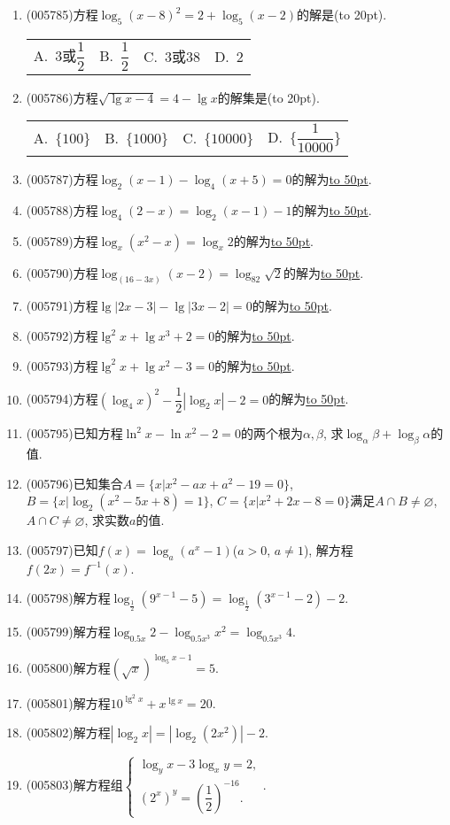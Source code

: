 \documentclass[10pt,a4paper]{article}
\newcommand{\blank}[1]{\underline{\hbox to #1pt{}}}
\newcommand{\bracket}[1]{(\hbox to #1pt{})}
\newcommand{\fourch}[4]{\par\begin{tabular}{p{.23\textwidth}p{.23\textwidth}p{.23\textwidth}p{.23\textwidth}}
A.~#1 &B.~#2& C.~#3& D.~#4
\end{tabular}}
\begin{document}
\begin{enumerate}[1.]
\fourch{$10^{1+\sqrt 2}$或$10^{1-\sqrt 2}$}{$1+\sqrt 2$或$1-\sqrt 2$}{$10^{1+\sqrt 3}$或$10^{1-\sqrt 3}$}{$1+\sqrt 3$或$1-\sqrt 3$}
\item {\tiny (005785)}方程$\log_5(x-8)^2=2+\log_5(x-2)$的解是\bracket{20}.
\fourch{3或$\dfrac 12$}{$\dfrac 12$}{$3$或$38$}{$2$}
\item {\tiny (005786)}方程$\sqrt {\lg x-4}=4-\lg x$的解集是\bracket{20}.
\fourch{$\{100\}$}{$\{1000\}$}{$\{10000\}$}{$\{\dfrac 1{10000}\}$}
\item {\tiny (005787)}方程$\log_2(x-1)-\log_4(x+5)=0$的解为\blank{50}.
\item {\tiny (005788)}方程$\log_4(2-x)=\log_2(x-1)-1$的解为\blank{50}.
\item {\tiny (005789)}方程$\log_x(x^2-x)=\log_x2$的解为\blank{50}.
\item {\tiny (005790)}方程$\log_{(16-3x)}(x-2)=\log_82\sqrt 2$的解为\blank{50}.
\item {\tiny (005791)}方程$\lg|2x-3|-\lg|3x-2|=0$的解为\blank{50}.
\item {\tiny (005792)}方程$\lg ^2x+\lg x^3+2=0$的解为\blank{50}.
\item {\tiny (005793)}方程$\lg ^2x+\lg x^2-3=0$的解为\blank{50}.
\item {\tiny (005794)}方程$(\log_4x)^2-\dfrac 12|\log_2x|-2=0$的解为\blank{50}.
\item {\tiny (005795)}已知方程$\ln ^2x-\ln x^2-2=0$的两个根为$\alpha ,\beta$, 求$\log_{\alpha }\beta +\log_{\beta }\alpha$的值.
\item {\tiny (005796)}已知集合$A=\{x|x^2-ax+a^2-19=0\}$, $B=\{x|\log_2(x^2-5x+8)=1\}$, $C=\{x|x^2+2x-8=0\}$满足$A\cap B\ne \varnothing$, $A\cap C\ne \varnothing$, 求实数$a$的值.
\item {\tiny (005797)}已知$f(x)=\log_a(a^x-1)$($a>0$, $a\ne 1$), 解方程$f(2x)=f^{-1}(x)$.
\item {\tiny (005798)}解方程$\log_{\frac 12}(9^{x-1}-5)=\log_{\frac 12}(3^{x-1}-2)-2$.
\item {\tiny (005799)}解方程$\log_{0.5x}2-\log_{0.5x^3}x^2=\log_{0.5x^3}4$.
\item {\tiny (005800)}解方程$(\sqrt x)^{\log_5x-1}=5$.
\item {\tiny (005801)}解方程$10^{\lg ^2x}+x^{\lg x}=20$.
\item {\tiny (005802)}解方程$|\log_2x|=|\log_2(2x^2)|-2$.
\item {\tiny (005803)}解方程组$\begin{cases} \log_yx-3\log_xy=2, \\ (2^x)^y=(\dfrac 12)^{-16}. \end{cases}$.

\end{enumerate}
\end{document}

